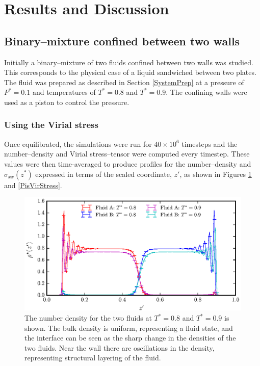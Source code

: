 \section{Results and Discussion}
\subsection{Binary--mixture confined between two walls}\label{Piston}
Initially a binary--mixture of two fluids confined between two walls was studied. 
This corresponds to the physical case of a liquid sandwiched between two plates.
The fluid was prepared as described in Section \ref{SystemPrep} at a pressure of $P^{*} = 0.1$ and temperatures of $T^{*} = 0.8$ and $T^{*} = 0.9$.
The confining walls were used as a piston to control the pressure.

\subsubsection{Using the Virial stress}\label{VirialStressPiston}
Once equilibrated, the simulations were run for $40 \times 10^{6}$ timesteps and the number--density and Virial stress--tensor were computed every timestep.
These values were then time-averaged to produce profiles for the number--density and $\sigma_{xx}(z^{*})$ expressed in terms of the scaled coordinate, $z'$, as shown in Figures \ref{PisVirRho} and \ref{PisVirStress}. 

\FloatBarrier
\begin{figure}[h]
\centering
\includegraphics[scale=0.8]{PisVirRho}
\caption{The number density for the two fluids at $T^{*} = 0.8$ and $T^{*} = 0.9$ is shown. 
The bulk density is uniform, representing a fluid state, and the interface can be seen as the sharp change in the densities of the two fluids.
Near the wall there are oscillations in the density, representing structural layering of the fluid.}
\label{PisVirRho}
\end{figure}


